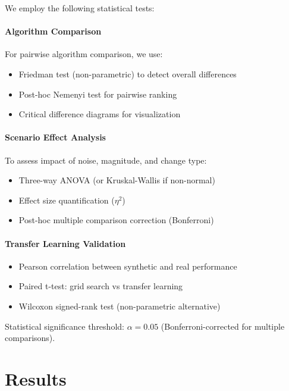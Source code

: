 \documentclass[journal,article,submit,pdftex,moreauthors]{Definitions/mdpi}
\begin{document}
We employ the following statistical tests:

\paragraph{Algorithm Comparison}

For pairwise algorithm comparison, we use:
\begin{itemize}
    \item Friedman test (non-parametric) to detect overall differences
    \item Post-hoc Nemenyi test for pairwise ranking
    \item Critical difference diagrams for visualization
\end{itemize}

\paragraph{Scenario Effect Analysis}

To assess impact of noise, magnitude, and change type:
\begin{itemize}
    \item Three-way ANOVA (or Kruskal-Wallis if non-normal)
    \item Effect size quantification ($\eta^2$)
    \item Post-hoc multiple comparison correction (Bonferroni)
\end{itemize}

\paragraph{Transfer Learning Validation}

\begin{itemize}
    \item Pearson correlation between synthetic and real performance
    \item Paired t-test: grid search vs transfer learning
    \item Wilcoxon signed-rank test (non-parametric alternative)
\end{itemize}

Statistical significance threshold: $\alpha = 0.05$ (Bonferroni-corrected for multiple comparisons).


\section{Results}
\label{sec:results}
\end{document}
